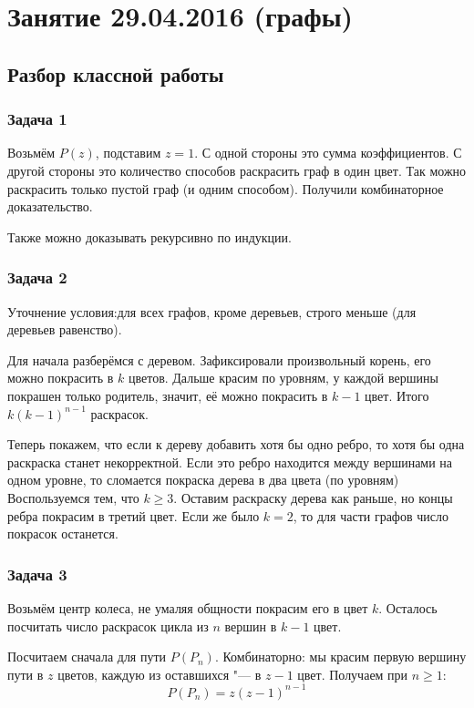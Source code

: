 \chapter{Занятие 29.04.2016 (графы)}

\section{Разбор классной работы}
\subsection{Задача 1}
	Возьмём $P(z)$, подставим $z=1$.
	С одной стороны это сумма коэффициентов.
	С другой стороны это количество способов раскрасить граф в один цвет.
	Так можно раскрасить только пустой граф (и одним способом).
	Получили комбинаторное доказательство.

	Также можно доказывать рекурсивно по индукции.

\subsection{Задача 2}
	Уточнение условия:для всех графов, кроме деревьев, строго меньше (для деревьев равенство).

	Для начала разберёмся с деревом.
	Зафиксировали произвольный корень, его можно покрасить в $k$ цветов.
	Дальше красим по уровням, у каждой вершины покрашен только родитель, значит,
	её можно покрасить в $k-1$ цвет.
	Итого $k(k-1)^{n-1}$ раскрасок.

	Теперь покажем, что если к дереву добавить хотя бы одно ребро, то хотя бы одна раскраска станет некорректной.
	Если это ребро находится между вершинами на одном уровне, то сломается покраска дерева в два цвета (по уровням)
	Воспользуемся тем, что $k \ge 3$.
	Оставим раскраску дерева как раньше, но концы ребра покрасим в третий цвет. 
	Если же было $k=2$, то для части графов число покрасок останется.

\subsection{Задача 3}
	Возьмём центр колеса, не умаляя общности покрасим его в цвет $k$.
	Осталось посчитать число раскрасок цикла из $n$ вершин в $k-1$ цвет.

	Посчитаем сначала для пути $P(P_n)$.
	Комбинаторно: мы красим первую вершину пути в $z$ цветов, каждую из оставшихся "--- в $z-1$ цвет.
	Получаем при $n \ge 1$:
	\[
		P(P_n) = z(z-1)^{n-1}
	\]

